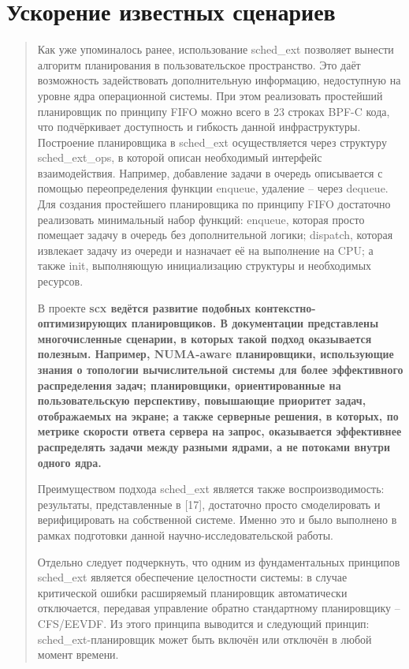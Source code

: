 \documentclass[12pt, oneside]{book}
\begin{document}
\section{Ускорение известных сценариев}
\begin{quote}
  Как уже упоминалось ранее, использование sched\_ext позволяет вынести
  алгоритм планирования в пользовательское пространство. Это даёт возможность
  задействовать дополнительную информацию, недоступную на уровне ядра
  операционной системы. При этом реализовать простейший планировщик
  по принципу FIFO можно всего в 23 строках BPF-C кода, что подчёркивает
  доступность и гибкость данной инфраструктуры.
  Построение планировщика в sched\_ext осуществляется
  через структуру sched\_ext\_ops, в которой описан необходимый
  интерфейс взаимодействия. Например, добавление задачи в очередь
  описывается с помощью переопределения функции enqueue,
  удаление -- через dequeue. Для создания простейшего планировщика
  по принципу FIFO достаточно реализовать минимальный набор функций:
  enqueue, которая просто помещает задачу в очередь без дополнительной логики;
  dispatch, которая извлекает задачу из очереди и назначает её на выполнение на CPU;
  а также init, выполняющую инициализацию структуры и необходимых ресурсов.

  В проекте \bf scx \normalfont [17] ведётся развитие подобных
  контекстно-оптимизирующих планировщиков.
  В документации представлены многочисленные сценарии, в которых такой подход
  оказывается полезным. Например, NUMA-aware планировщики, использующие знания
  о топологии вычислительной системы для более эффективного распределения задач;
  планировщики, ориентированные на пользовательскую перспективу, повышающие
  приоритет задач, отображаемых на экране; а также серверные решения,
  в которых, по метрике скорости ответа сервера на запрос, оказывается
  эффективнее распределять задачи между разными ядрами, а не потоками
  внутри одного ядра.

  Преимуществом подхода sched\_ext является также воспроизводимость: результаты,
  представленные в [17], достаточно просто смоделировать и верифицировать
  на собственной системе. Именно это и было выполнено в рамках подготовки
  данной научно-исследовательской работы.

  Отдельно следует подчеркнуть, что одним из фундаментальных принципов sched\_ext
  является обеспечение целостности системы: в случае критической ошибки расширяемый
  планировщик автоматически отключается, передавая управление обратно
  стандартному планировщику -- CFS/EEVDF. Из этого принципа
  выводится и следующий принцип: sched\_ext-планировщик может быть
  включён или отключён в любой момент времени.


\end{quote}
\end{document}
